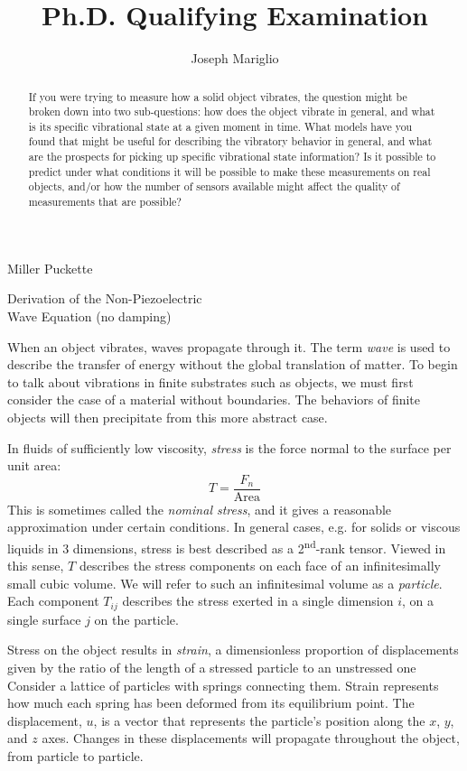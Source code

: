 \documentclass[a4paper,10pt]{report}
\title{Ph.D. Qualifying Examination}
\author{Joseph Mariglio}
\numberwithin{equation}{section}
\begin{document}
\maketitle

\begin{chapter}{Miller Puckette}
\begin{abstract}
If you were trying to measure how a solid object vibrates, the question might be broken down into two sub-questions: how does the object vibrate in general, and what is its specific vibrational state at a given moment in time. What models have you found that might be useful for describing the vibratory behavior in general, and what are the prospects for picking up specific vibrational state information? Is it possible to predict under what conditions it will be possible to make these measurements on real objects, and/or how the number of sensors available might affect the quality of measurements that are possible?
\end{abstract}
\begin{section}{Derivation of the Non-Piezoelectric \\ Wave Equation (no damping)}\label{sec:npwaveq_nd}

When an object vibrates, waves propagate through it. The term \emph{wave} is used to describe the transfer of energy without the global translation of matter. To begin to talk about vibrations in finite substrates such as objects, we must first consider the case of a material without boundaries. The behaviors of finite objects will then precipitate from this more abstract case.

In fluids of sufficiently low viscosity, \emph{stress} is the force normal to the surface per unit area:
\begin{equation*}\label{stressnorm}
T = \frac{F_n}{\text{Area}}
\end{equation*}
This is sometimes called the \emph{nominal stress}, and it gives a reasonable
approximation under certain conditions.
In general cases, e.g. for solids or viscous liquids in 3 dimensions, stress is best described as a 2\textsuperscript{nd}-rank tensor. Viewed in this sense, $T$ 
describes the stress components on each face of an infinitesimally small cubic
volume. We will refer to such an infinitesimal volume as a \emph{particle}. Each component $T_{ij}$ describes the stress exerted in a single dimension $i$, on a single surface $j$ on the particle. \cite{Ballantine1997, Kino1987}

Stress on the object results in \emph{strain}, a dimensionless proportion of
displacements given by the ratio of the length of a stressed particle to an unstressed one Consider a lattice of particles with springs connecting them. Strain represents how much each spring has been deformed from its equilibrium point.
The displacement, $u$, is a vector that represents the particle's position along
the $x$, $y$, and $z$ axes. Changes in these displacements will propagate throughout the object, from particle to particle. \cite{Ballantine1997, Kino1987}


\end{section}
\end{chapter}
\end{document}
